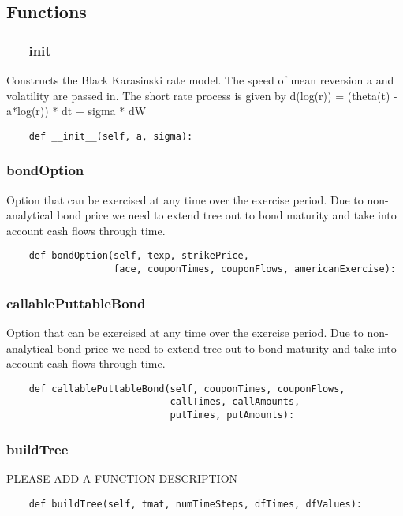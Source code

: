 \documentclass[twoside,11pt]{book}
\begin{document}
\subsection*{Functions}

\subsubsection*{{\bf \_\_init\_\_}}
Constructs the Black Karasinski rate model. The speed of mean reversion a and volatility are passed in. The short rate process is given by d(log(r)) = (theta(t) - a*log(r)) * dt  + sigma * dW  

\begin{lstlisting}
    def __init__(self, a, sigma):
\end{lstlisting}

\subsubsection*{{\bf bondOption}}
Option that can be exercised at any time over the exercise period. Due to non-analytical bond price we need to extend tree out to bond maturity and take into account cash flows through time.  

\begin{lstlisting}
    def bondOption(self, texp, strikePrice,
                   face, couponTimes, couponFlows, americanExercise):
\end{lstlisting}

\subsubsection*{{\bf callablePuttableBond}}
Option that can be exercised at any time over the exercise period. Due to non-analytical bond price we need to extend tree out to bond maturity and take into account cash flows through time.  

\begin{lstlisting}
    def callablePuttableBond(self, couponTimes, couponFlows,
                             callTimes, callAmounts, 
                             putTimes, putAmounts):
\end{lstlisting}

\subsubsection*{{\bf buildTree}}
PLEASE ADD A FUNCTION DESCRIPTION

\begin{lstlisting}
    def buildTree(self, tmat, numTimeSteps, dfTimes, dfValues):
\end{lstlisting}
\end{document}
